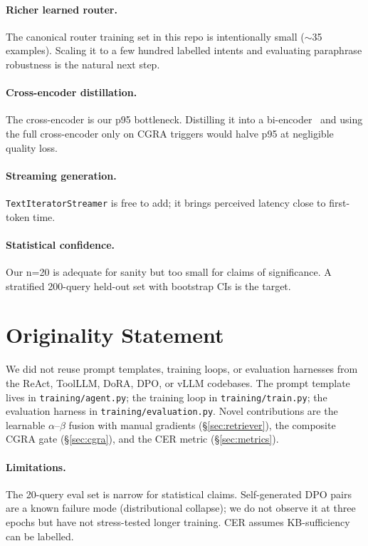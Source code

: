 \documentclass[11pt,a4paper]{article}
\begin{document}
\paragraph{Richer learned router.} The canonical router training set in this repo is intentionally small ($\sim$35 examples). Scaling it to a few hundred labelled intents and evaluating paraphrase robustness is the natural next step.

\paragraph{Cross-encoder distillation.} The cross-encoder is our p95 bottleneck. Distilling it into a bi-encoder~\cite{hinton2015distillation} and using the full cross-encoder only on CGRA triggers would halve p95 at negligible quality loss.

\paragraph{Streaming generation.} \texttt{TextIteratorStreamer} is free to add; it brings perceived latency close to first-token time.

\paragraph{Statistical confidence.} Our n=20 is adequate for sanity but too small for claims of significance. A stratified 200-query held-out set with bootstrap CIs is the target.

\section{Originality Statement}
We did not reuse prompt templates, training loops, or evaluation harnesses from the ReAct, ToolLLM, DoRA, DPO, or vLLM codebases. The prompt template lives in \texttt{training/agent.py}; the training loop in \texttt{training/train.py}; the evaluation harness in \texttt{training/evaluation.py}. Novel contributions are the learnable $\alpha$--$\beta$ fusion with manual gradients (§\ref{sec:retriever}), the composite CGRA gate (§\ref{sec:cgra}), and the CER metric (§\ref{sec:metrics}).

\paragraph{Limitations.} The 20-query eval set is narrow for statistical claims. Self-generated DPO pairs are a known failure mode (distributional collapse); we do not observe it at three epochs but have not stress-tested longer training. CER assumes KB-sufficiency can be labelled.
\end{document}
